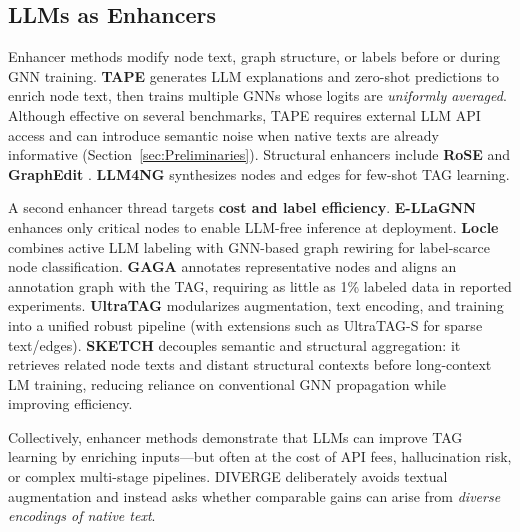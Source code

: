 \documentclass[a4paper,fleqn]{cas-sc}
\begin{document}
\subsection{LLMs as Enhancers}
Enhancer methods modify node text, graph structure, or labels before or during GNN training. \textbf{TAPE} \citep{he2024harnessing} generates LLM explanations and zero-shot predictions to enrich node text, then trains multiple GNNs whose logits are \emph{uniformly averaged}. Although effective on several benchmarks, TAPE requires external LLM API access and can introduce semantic noise when native texts are already informative (Section~\ref{sec:Preliminaries}). Structural enhancers include \textbf{RoSE} \citep{Sun2026TopologicalEnhancerTAG} and \textbf{GraphEdit} \citep{guo2024graphedit}. \textbf{LLM4NG} \citep{Yu2025NodeGenerationTAG} synthesizes nodes and edges for few-shot TAG learning.

A second enhancer thread targets \textbf{cost and label efficiency}. \textbf{E-LLaGNN} \citep{Jaiswal2024AllAgainstSome} enhances only critical nodes to enable LLM-free inference at deployment. \textbf{Locle} \citep{zhang2025leveraging} combines active LLM labeling with GNN-based graph rewiring for label-scarce node classification. \textbf{GAGA} \citep{hu2025gaga} annotates representative nodes and aligns an annotation graph with the TAG, requiring as little as 1\% labeled data in reported experiments. \textbf{UltraTAG} \citep{yu2025ultratag} modularizes augmentation, text encoding, and training into a unified robust pipeline (with extensions such as UltraTAG-S for sparse text/edges). \textbf{SKETCH} \citep{zhou-etal-2025sketch} decouples semantic and structural aggregation: it retrieves related node texts and distant structural contexts before long-context LM training, reducing reliance on conventional GNN propagation while improving efficiency.

Collectively, enhancer methods demonstrate that LLMs can improve TAG learning by enriching inputs---but often at the cost of API fees, hallucination risk, or complex multi-stage pipelines. DIVERGE deliberately avoids textual augmentation and instead asks whether comparable gains can arise from \emph{diverse encodings of native text}.
\end{document}
